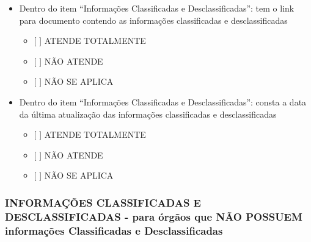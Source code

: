 \documentclass[]{book}
\providecommand{\tightlist}{%
  \setlength{\itemsep}{0pt}\setlength{\parskip}{0pt}}
\begin{document}
\begin{itemize}
\tightlist
\item
  Dentro do item ``Informações Classificadas e Desclassificadas'': tem o link para documento contendo as informações classificadas e desclassificadas

  \begin{itemize}
  \tightlist
  \item
    {[} {]} ATENDE TOTALMENTE
  \item
    {[} {]} NÃO ATENDE
  \item
    {[} {]} NÃO SE APLICA
  \end{itemize}
\item
  Dentro do item ``Informações Classificadas e Desclassificadas'': consta a data da última atualização das informações classificadas e desclassificadas

  \begin{itemize}
  \tightlist
  \item
    {[} {]} ATENDE TOTALMENTE
  \item
    {[} {]} NÃO ATENDE
  \item
    {[} {]} NÃO SE APLICA
  \end{itemize}
\end{itemize}

\hypertarget{informauxe7uxf5es-classificadas-e-desclassificadas---para-uxf3rguxe3os-que-nuxe3o-possuem-informauxe7uxf5es-classificadas-e-desclassificadas}{%
\subsubsection*{INFORMAÇÕES CLASSIFICADAS E DESCLASSIFICADAS - para órgãos que NÃO POSSUEM informações Classificadas e Desclassificadas}\label{informauxe7uxf5es-classificadas-e-desclassificadas---para-uxf3rguxe3os-que-nuxe3o-possuem-informauxe7uxf5es-classificadas-e-desclassificadas}}
\end{document}
